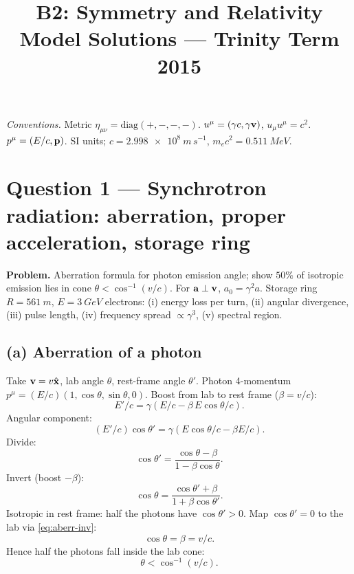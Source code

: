 \documentclass[11pt]{article}
\title{B2: Symmetry and Relativity\\ Model Solutions --- Trinity Term 2015}
\author{}
\date{}
\begin{document}
\maketitle

\noindent\textit{Conventions.} Metric $\eta_{\mu\nu}=\mathrm{diag}(+,-,-,-)$. $u^\mu=(\gamma c,\gamma\vb v)$, $u_\mu u^\mu=c^2$. $p^\mu=(E/c,\vb p)$. SI units; $c=\SI{2.998e8}{m\,s^{-1}}$, $m_e c^2=\SI{0.511}{MeV}$.

\section*{Question 1 --- Synchrotron radiation: aberration, proper acceleration, storage ring}

\textbf{Problem.} Aberration formula for photon emission angle; show $50\%$ of isotropic emission lies in cone $\theta<\cos^{-1}(v/c)$. For $\vb a\perp\vb v$, $a_0=\gamma^2 a$. Storage ring $R=\SI{561}{m}$, $E=\SI{3}{GeV}$ electrons: (i) energy loss per turn, (ii) angular divergence, (iii) pulse length, (iv) frequency spread $\propto\gamma^3$, (v) spectral region.

\subsection*{(a) Aberration of a photon}

Take $\vb v=v\hat{\vb x}$, lab angle $\theta$, rest-frame angle $\theta'$. Photon 4-momentum $p^\mu=(E/c)(1,\cos\theta,\sin\theta,0)$.
Boost from lab to rest frame ($\beta=v/c$):
\[ E'/c = \gamma(E/c - \beta\,E\cos\theta/c). \]
Angular component:
\[ (E'/c)\cos\theta' = \gamma(E\cos\theta/c - \beta E/c). \]
Divide:
\begin{equation}
\cos\theta' = \frac{\cos\theta-\beta}{1-\beta\cos\theta}.
\label{eq:aberr}
\end{equation}
Invert (boost $-\beta$):
\begin{equation}
\boxed{\;\cos\theta = \frac{\cos\theta'+\beta}{1+\beta\cos\theta'}.\;}
\label{eq:aberr-inv}
\end{equation}
Isotropic in rest frame: half the photons have $\cos\theta'>0$.
Map $\cos\theta'=0$ to the lab via \eqref{eq:aberr-inv}:
\[ \cos\theta = \beta = v/c. \]
Hence half the photons fall inside the lab cone:
\begin{equation}
\boxed{\;\theta<\cos^{-1}(v/c).\;}
\end{equation}
\end{document}

